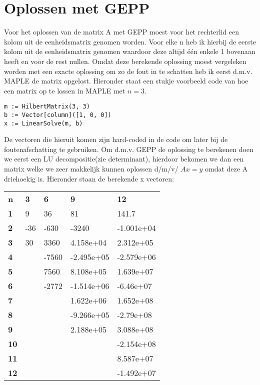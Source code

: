 \documentclass[10pt,a4paper]{article}
\begin{document}
\section{Oplossen met GEPP}
Voor het oplossen van de matrix A met GEPP moest voor het rechterlid een kolom uit de eenheidsmatrix genomen worden. Voor elke n heb ik hierbij de eerste kolom uit de eenheidsmatrix genomen waardoor deze altijd één enkele 1 bovenaan heeft en voor de rest nullen. Omdat deze berekende oplossing moest vergeleken worden met een exacte oplossing om zo de fout in te schatten heb ik eerst d.m.v. MAPLE de matrix opgelost. Hieronder staat een stukje voorbeeld code van hoe een matrix op te lossen in MAPLE met $
n = 3$.
\begin{lstlisting}
m := HilbertMatrix(3, 3)
b := Vector[column]([1, 0, 0])
x := LinearSolve(m, b)
\end{lstlisting}
De vectoren die hieruit komen zijn hard-coded in de code om later bij de foutenafschatting te gebruiken.
\newline
\newline
Om d.m.v. GEPP de oplossing te berekenen doen we eerst een LU decompositie(zie determinant), hierdoor bekomen we dan een matrix welke we zeer makkelijk kunnen oplossen d/m/v/ $Ax = y$ omdat deze A driehoekig is. Hieronder staan de berekende x vectoren:
\newline
\begin{center}
\begin{tabular}{lllll}
\textbf{n}  & \textbf{3} & \textbf{6} & \textbf{9} & \textbf{12} \\
\textbf{1}  & 9          & 36         & 81         & 141.7       \\
\textbf{2}  & -36        & -630       & -3240      & -1.001e+04  \\
\textbf{3}  & 30         & 3360       & 4.158e+04  & 2.312e+05   \\
\textbf{4}  &            & -7560      & -2.495e+05 & -2.579e+06  \\
\textbf{5}  &            & 7560       & 8.108e+05  & 1.639e+07   \\
\textbf{6}  &            & -2772      & -1.514e+06 & -6.46e+07   \\
\textbf{7}  &            &            & 1.622e+06  & 1.652e+08   \\
\textbf{8}  &            &            & -9.266e+05 & -2.79e+08   \\
\textbf{9}  &            &            & 2.188e+05  & 3.088e+08   \\
\textbf{10} &            &            &            & -2.154e+08  \\
\textbf{11} &            &            &            & 8.587e+07   \\
\textbf{12} &            &            &            & -1.492e+07 
\end{tabular}
\end{center}
\end{document}
